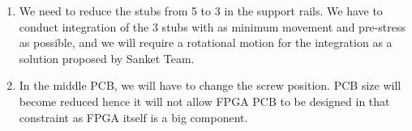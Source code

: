 \documentclass[../../main.tex]{subfiles}
\begin{document}
\begin{enumerate}
    \begin{enumerate}
        \item We need to reduce the stubs from 5 to 3 in the support rails. We have to conduct integration of the 3 stubs with as minimum movement and pre-stress as possible, and we will require a rotational motion for the integration as a solution proposed by Sanket Team.
        \item In the middle PCB, we will have to change the screw position. PCB size will become reduced hence it will not allow FPGA PCB to be designed in that constraint as FPGA itself is a big component.
    \end{enumerate}
\end{enumerate}
\end{document}
